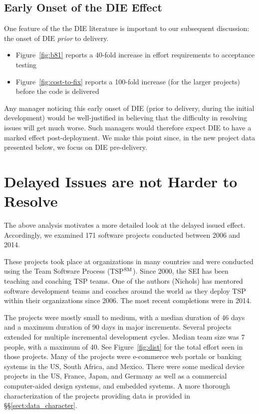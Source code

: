 \documentclass[smallcondensed]{svjour3}
\newcommand{\bi}{\begin{itemize}}%
\newcommand{\ei}{\end{itemize}}
\newcommand{\tion}[1]{\S\ref{sect:#1}}
\newcommand{\fig}[1]{Figure~\ref{fig:#1}}
\begin{document}
\subsection{Early Onset of the DIE Effect}\label{sect:earlyonset}

One feature of the the DIE literature is important to our subsequent discussion:   
the onset of  DIE  {\em prior} to delivery.
\bi
\item  
\fig{b81} reports a 40-fold increase in effort requirements to acceptance testing
\item
 \fig{cost-to-fix} reports a 100-fold increase
(for the larger projects) before the code is delivered 
\ei
Any manager noticing this  early onset of DIE (prior to delivery, during the initial development)
would be well-justified
in believing that  the difficulty in resolving issues  will get much worse. Such managers
would therefore expect DIE to have a marked effect post-deployment.
We make this point since,  in the new project data presented below, we focus on DIE pre-delivery.


 

\section{Delayed Issues are not  Harder  to Resolve}
\label{sect:analysis}
The above analysis motivates a more detailed look at the delayed issued effect.  
Accordingly, we examined 171 software projects conducted between 2006 and 2014. 

These projects took place at organizations in many countries and were conducted using  the Team Software Process (TSP$\textsuperscript{SM}$). Since 2000, the SEI has been teaching and coaching TSP teams. One of the authors (Nichols) has mentored software development teams and coaches around the world as they deploy TSP within their organizations since 2006.  The  most recent completions were in 2014.

The projects were mostly small to medium, with a median duration of 46 days and a maximum duration of 90 days in major increments. 
Several projects extended for multiple incremental development cycles. 
Median team size was 7 people, with a maximum of 40. See \fig{dist} for the total
effort seen in those projects. Many of the projects were e-commerce web portals or banking systems in the US, South Africa, and Mexico. 
There were  some  medical device projects in  the US, France, Japan, and Germany as well  as a commercial computer-aided design systems, and embedded systems. A more thorough characterization of the projects providing data is provided in \S\tion{data_character}.
\end{document}
